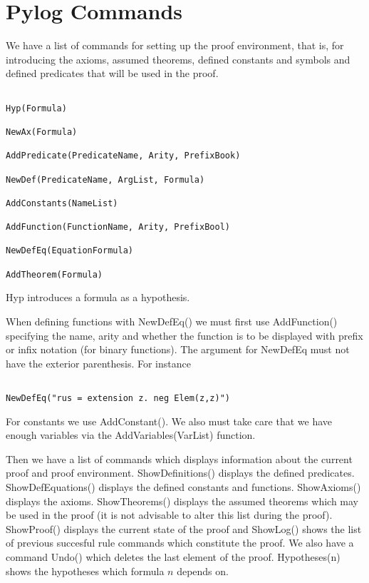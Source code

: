 \documentclass[12pt,leqno]{article}
\numberwithin{equation}{section}
\begin{document}
\section*{Pylog Commands}

We have a list of commands for setting up the proof environment, that is, for introducing the axioms, assumed theorems, defined constants and symbols and defined predicates that will be used in the proof.

\begin{verbatim}
	
Hyp(Formula)	
	
NewAx(Formula)

AddPredicate(PredicateName, Arity, PrefixBook)

NewDef(PredicateName, ArgList, Formula)

AddConstants(NameList)

AddFunction(FunctionName, Arity, PrefixBool)

NewDefEq(EquationFormula)

AddTheorem(Formula)

\end{verbatim}

Hyp introduces a formula as a hypothesis.

When defining functions with NewDefEq() we must first use AddFunction() specifying the name, arity and whether the function is to be displayed with prefix or infix notation (for binary functions). The argument for NewDefEq must not have the exterior parenthesis. For instance

\begin{verbatim}

NewDefEq("rus = extension z. neg Elem(z,z)")

\end{verbatim}


 For constants we use AddConstant().
We also must take care that we have enough variables via the AddVariables(VarList) function.

Then we have a list of commands which displays information about the current proof and proof environment. ShowDefinitions()  displays the defined predicates. ShowDefEquations() displays the defined constants and functions. ShowAxioms() displays the axioms.  ShowTheorems() displays the assumed theorems which may be used in the proof (it is not advisable to alter this list during the proof). ShowProof() displays the current state of the proof and ShowLog() shows the list of previous succesful rule commands which constitute the proof. We also have a command Undo() which deletes the last element of the proof. Hypotheses(n) shows the hypotheses which formula $n$ depends on.
\end{document}
